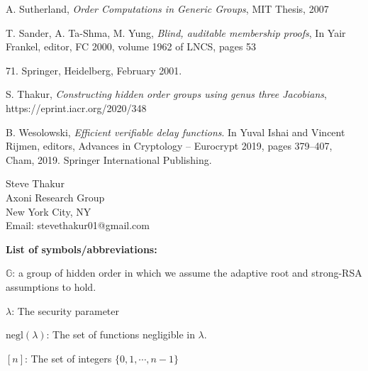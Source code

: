 \documentclass[11pt, lettersize, notitlepage, leqno, footskip=0.6cm]{article}
\newcommand{\negl}{\mr{negl}}
\newcommand{\mb}{\mathbb}
\newcommand{\mr}{\mathrm}
\newcommand{\lam}{\lambda}
\numberwithin{equation}{section}
\begin{document}
\noindent [Sut07] A. Sutherland, \textit{Order Computations in Generic Groups}, MIT Thesis, 2007 \vspace{0.1cm}

\noindent [STY01] T. Sander, A. Ta-Shma, M. Yung, \textit{Blind, auditable membership proofs}, In Yair Frankel, editor, FC 2000, volume 1962 of LNCS, pages 53{71. Springer, Heidelberg, February 2001.\vspace{0.1cm}


\noindent [Th20] S. Thakur, \textit{Constructing hidden order groups using genus three Jacobians}, https://eprint.iacr.org/2020/348\vspace{0.1cm} 

\noindent [Wes19] B. Wesolowski, \textit{Efficient verifiable delay functions}. In Yuval Ishai and Vincent Rijmen, editors, Advances in Cryptology – Eurocrypt 2019, pages 379–407, Cham, 2019. Springer International Publishing.\vspace{0.1cm}




\bigskip

\normalsize
\noindent Steve Thakur\\
Axoni Research Group\\
New York City, NY\\
Email: stevethakur01@gmail.com



\normalsize

\bigskip
\bigskip
\bigskip
\bigskip
\bigskip



\begin{center}\textbf{List of symbols/abbreviations:}\end{center}

\noindent $\mb{G}$: a group of hidden order in which we assume the adaptive root and strong-RSA assumptions to hold. \vspace{0.1cm}

\noindent $\lam$: The security parameter \vspace{0.1cm}

\noindent $\negl(\lam)$: The set of functions negligible in $\lam$. \vspace{0.1cm}

\noindent $[n]$: The set of integers $\{0,1,\cdots,n-1 \}$ \vspace{0.1cm}

}
\end{document}
